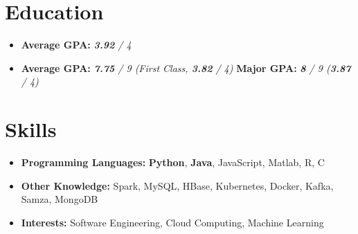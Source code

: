 \documentclass{resume}
\begin{document}



\section{Education}
\begin{itemize}[parsep=0.5ex]
  \item \textbf{Average GPA:} \textit{\textbf{3.92} / 4}
\end{itemize}
\begin{itemize}[parsep=0.5ex]
  \item \textbf{Average GPA:} \textit{\textbf{7.75} / 9 (First Class, \textbf{3.82} / 4)} \hspace{0.6cm} \textbf{Major GPA:} \textit{\textbf{8} / 9 (\textbf{3.87} / 4)}
\end{itemize}

\section{Skills}
\begin{itemize}[parsep=0.5ex]
  \item \textbf{Programming Languages:} \textbf{Python}, \textbf{Java}, JavaScript, Matlab, R, C
  \item \textbf{Other Knowledge:} Spark, MySQL, HBase, Kubernetes, Docker, Kafka, Samza, MongoDB
  \item \textbf{Interests:} Software Engineering, Cloud Computing, Machine Learning
\end{itemize}
\end{document}
